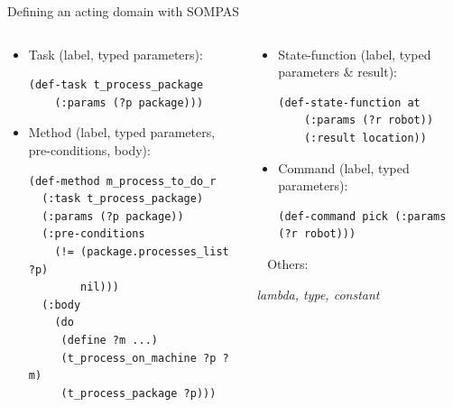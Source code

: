 \begin{frame}[t,fragile]{Defining an acting domain with SOMPAS}
    \setlength{\leftmargini}{0pt}
    \begin{columns}
        \begin{column}{0.5\textwidth}
            \begin{itemize}
                \footnotesize
                \item Task (label, typed parameters):
                \tiny
                \begin{lstlisting}
(def-task t_process_package
    (:params (?p package)))
                \end{lstlisting}
                \footnotesize
                \pause
                \item Method (label, typed parameters, pre-conditions, body):
                \tiny
                \begin{lstlisting}
(def-method m_process_to_do_r
  (:task t_process_package)
  (:params (?p package))
  (:pre-conditions
    (!= (package.processes_list ?p)
        nil)))
  (:body
    (do
     (define ?m ...)
     (t_process_on_machine ?p ?m)
     (t_process_package ?p)))   
                \end{lstlisting}
            \end{itemize}
        \end{column}
    \pause
        \begin{column}{0.5\textwidth}
            \begin{itemize}
    \pause
            \footnotesize
            \item State-function (label, typed parameters \& result):
            \tiny
            \begin{lstlisting}
(def-state-function at
    (:params (?r robot))
    (:result location))
            \end{lstlisting}
    \pause
            \footnotesize
            \item Command (label, typed parameters):
            \tiny
            \begin{lstlisting}
(def-command pick (:params (?r robot)))
                \end{lstlisting}
            \end{itemize}

    \pause
            ~
        \normalsize
        Others:
        
        \textit{lambda, type, constant}
        \end{column}

    \end{columns}
\end{frame}